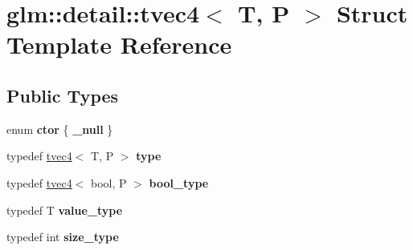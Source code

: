 \hypertarget{structglm_1_1detail_1_1tvec4}{\section{glm\-:\-:detail\-:\-:tvec4$<$ T, P $>$ Struct Template Reference}
\label{structglm_1_1detail_1_1tvec4}
}
\subsection*{Public Types}
\begin{DoxyCompactItemize}
\item 
enum {\bfseries ctor} \{ {\bfseries \-\_\-null}
 \}
\item 
\hypertarget{structglm_1_1detail_1_1tvec4_a6f73aac80b830832bddd293627bd79b1}{typedef \hyperlink{structglm_1_1detail_1_1tvec4}{tvec4}$<$ T, P $>$ {\bfseries type}}\label{structglm_1_1detail_1_1tvec4_a6f73aac80b830832bddd293627bd79b1}

\item 
\hypertarget{structglm_1_1detail_1_1tvec4_ae066d27ec9adb11c25f37abe9b3a4161}{typedef \hyperlink{structglm_1_1detail_1_1tvec4}{tvec4}$<$ bool, P $>$ {\bfseries bool\-\_\-type}}\label{structglm_1_1detail_1_1tvec4_ae066d27ec9adb11c25f37abe9b3a4161}

\item 
\hypertarget{structglm_1_1detail_1_1tvec4_a9fefebb21a1ed7cdabd61fc4f0b8e28e}{typedef T {\bfseries value\-\_\-type}}\label{structglm_1_1detail_1_1tvec4_a9fefebb21a1ed7cdabd61fc4f0b8e28e}

\item 
\hypertarget{structglm_1_1detail_1_1tvec4_a92061c78c7801c2cedb6c1bae68d1fd4}{typedef int {\bfseries size\-\_\-type}}\label{structglm_1_1detail_1_1tvec4_a92061c78c7801c2cedb6c1bae68d1fd4}

\end{DoxyCompactItemize}
